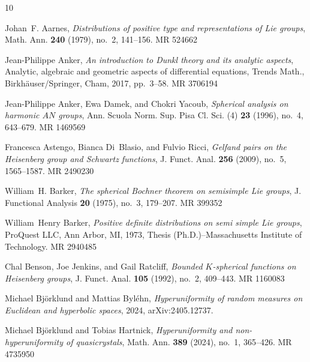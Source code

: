 \documentclass[12pt,reqno,a4paper]{amsart}
\theoremstyle{theorem}
\theoremstyle{definition}
\numberwithin{theorem}{section}
\numberwithin{equation}{section}
\begin{document}

\providecommand{\bysame}{\leavevmode\hbox to3em{\hrulefill}\thinspace}
\providecommand{\MR}{\relax\ifhmode\unskip\space\fi MR }
\providecommand{\MRhref}[2]{%
  \href{http://www.ams.org/mathscinet-getitem?mr=#1}{#2}
}
\providecommand{\href}[2]{#2}
\begin{thebibliography}{10}

Johan~F. Aarnes, \emph{Distributions of positive type and representations of
  {L}ie groups}, Math. Ann. \textbf{240} (1979), no.~2, 141--156. \MR{524662}

Jean-Philippe Anker, \emph{An introduction to {D}unkl theory and its analytic
  aspects}, Analytic, algebraic and geometric aspects of differential
  equations, Trends Math., Birkh\"auser/Springer, Cham, 2017, pp.~3--58.
  \MR{3706194}

Jean-Philippe Anker, Ewa Damek, and Chokri Yacoub, \emph{Spherical analysis on
  harmonic {$AN$} groups}, Ann. Scuola Norm. Sup. Pisa Cl. Sci. (4) \textbf{23}
  (1996), no.~4, 643--679. \MR{1469569}

Francesca Astengo, Bianca Di~Blasio, and Fulvio Ricci, \emph{Gelfand pairs on
  the {H}eisenberg group and {S}chwartz functions}, J. Funct. Anal.
  \textbf{256} (2009), no.~5, 1565--1587. \MR{2490230}

William~H. Barker, \emph{The spherical {B}ochner theorem on semisimple {L}ie
  groups}, J. Functional Analysis \textbf{20} (1975), no.~3, 179--207.
  \MR{399352}

William~Henry Barker, \emph{P{ositive} {definite} {distributions} {on} {semi}
  {simple} {Lie} {groups}}, ProQuest LLC, Ann Arbor, MI, 1973, Thesis
  (Ph.D.)--Massachusetts Institute of Technology. \MR{2940485}

Chal Benson, Joe Jenkins, and Gail Ratcliff, \emph{Bounded {$K$}-spherical
  functions on {H}eisenberg groups}, J. Funct. Anal. \textbf{105} (1992),
  no.~2, 409--443. \MR{1160083}

Michael Bj\"{o}rklund and Mattias Byl\'{e}hn, \emph{Hyperuniformity of random
  measures on {E}uclidean and hyperbolic spaces}, 2024, arXiv:2405.12737.

Michael Bj\"orklund and Tobias Hartnick, \emph{Hyperuniformity and
  non-hyperuniformity of quasicrystals}, Math. Ann. \textbf{389} (2024), no.~1,
  365--426. \MR{4735950}


\end{thebibliography}
\end{document}
